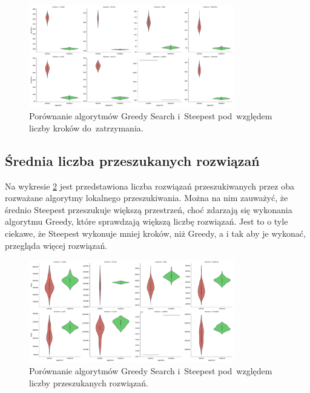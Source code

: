 \begin{figure}
\begin{center}
\includegraphics[width=0.8\textwidth]{graphs/iterations_comparison_violin.pdf}
\end{center}
\caption{Porównanie algorytmów Greedy Search i~Steepest pod~względem liczby kroków do~zatrzymania.}
\label{fig:steps}
\end{figure}

\subsection{Średnia liczba przeszukanych rozwiązań}

Na wykresie \ref{fig:nsol} jest przedstawiona liczba rozwiązań przeszukiwanych przez oba rozważane algorytmy lokalnego przeszukiwania. Można na nim zauważyć, że średnio Steepest przeszukuje większą przestrzeń, choć zdarzają się wykonania algorytmu Greedy, które sprawdzają większą liczbę rozwiązań. Jest to o tyle ciekawe, że Steepest wykonuje mniej kroków, niż Greedy, a i tak aby je wykonać, przegląda więcej rozwiązań.

\begin{figure}
\begin{center}
\includegraphics[width=0.8\textwidth]{graphs/steps_comparison_violin.pdf}
\end{center}
\caption{Porównanie algorytmów Greedy Search i~Steepest pod~względem liczby przeszukanych rozwiązań.}
\label{fig:nsol}
\end{figure}

